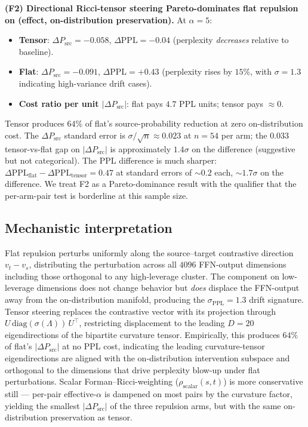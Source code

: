\documentclass[10pt,twocolumn]{article}
\begin{document}
\textbf{(F2) Directional Ricci-tensor steering Pareto-dominates flat repulsion on (effect, on-distribution preservation).} At $\alpha{=}5$:
\begin{itemize}\itemsep0pt
\item \textbf{Tensor}: $\Delta P_{\text{src}}{=}{-}0.058$, $\Delta\text{PPL}{=}{-}0.04$ (perplexity \emph{decreases} relative to baseline).
\item \textbf{Flat}: $\Delta P_{\text{src}}{=}{-}0.091$, $\Delta\text{PPL}{=}{+}0.43$ (perplexity rises by $15\%$, with $\sigma{=}1.3$ indicating high-variance drift cases).
\item \textbf{Cost ratio per unit $|\Delta P_{\text{src}}|$}: flat pays $4.7$ PPL units; tensor pays ${\approx}0$.
\end{itemize}
Tensor produces $64\%$ of flat's source-probability reduction at zero on-distribution cost. The $\Delta P_{\text{src}}$ standard error is $\sigma/\!\sqrt{n}\approx 0.023$ at $n{=}54$ per arm; the $0.033$ tensor-vs-flat gap on $|\Delta P_{\text{src}}|$ is approximately $1.4\sigma$ on the difference (suggestive but not categorical). The PPL difference is much sharper: $\Delta\text{PPL}_{\text{flat}}{-}\Delta\text{PPL}_{\text{tensor}}{=}0.47$ at standard errors of $\sim 0.2$ each, $\sim 1.7\sigma$ on the difference. We treat F2 as a Pareto-dominance result with the qualifier that the per-arm-pair test is borderline at this sample size.

\subsection{Mechanistic interpretation}
\label{sec:steering-mech}

Flat repulsion perturbs uniformly along the source--target contrastive direction $v_t{-}v_s$, distributing the perturbation across all $4096$ FFN-output dimensions including those orthogonal to any high-leverage cluster. The component on low-leverage dimensions does not change behavior but \emph{does} displace the FFN-output away from the on-distribution manifold, producing the $\sigma_{\text{PPL}}{=}1.3$ drift signature. Tensor steering replaces the contrastive vector with its projection through $U\,\mathrm{diag}(\sigma(\Lambda))\,U^{\!\top}$, restricting displacement to the leading $D{=}20$ eigendirections of the bipartite curvature tensor. Empirically, this produces $64\%$ of flat's $|\Delta P_{\text{src}}|$ at no PPL cost, indicating the leading curvature-tensor eigendirections are aligned with the on-distribution intervention subspace and orthogonal to the dimensions that drive perplexity blow-up under flat perturbations. Scalar Forman--Ricci-weighting ($\rho_{\text{scalar}}(s,t)$) is more conservative still --- per-pair effective-$\alpha$ is dampened on most pairs by the curvature factor, yielding the smallest $|\Delta P_{\text{src}}|$ of the three repulsion arms, but with the same on-distribution preservation as tensor.
\end{document}
